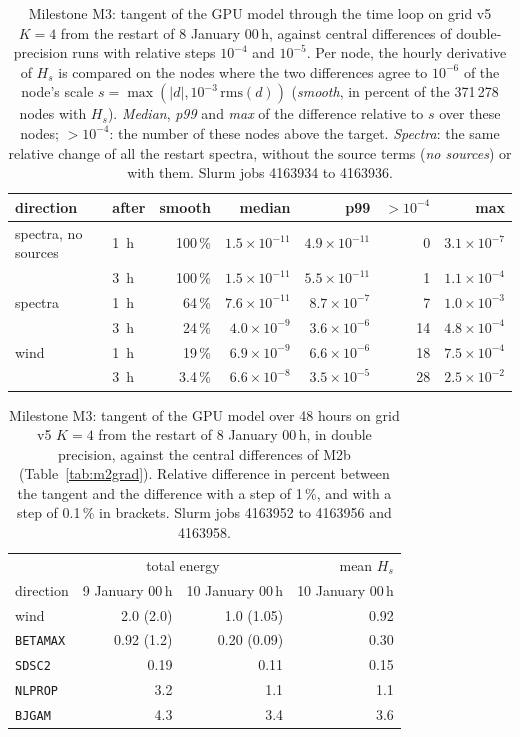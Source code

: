 \documentclass[11pt,a4paper]{article}
\begin{document}
\begin{table}[H]
\centering\small
\begin{tabular}{llrrrrr}
\toprule
direction & after & smooth & median & p99 & $>10^{-4}$ & max \\
\midrule
spectra, no sources & \SI{1}{h} & 100\,\% & $1.5\times10^{-11}$ & $4.9\times10^{-11}$ & 0 & $3.1\times10^{-7}$ \\
 & \SI{3}{h} & 100\,\% & $1.5\times10^{-11}$ & $5.5\times10^{-11}$ & 1 & $1.1\times10^{-4}$ \\
spectra & \SI{1}{h} & 64\,\% & $7.6\times10^{-11}$ & $8.7\times10^{-7}$ & 7 & $1.0\times10^{-3}$ \\
 & \SI{3}{h} & 24\,\% & $4.0\times10^{-9}$ & $3.6\times10^{-6}$ & 14 & $4.8\times10^{-4}$ \\
wind & \SI{1}{h} & 19\,\% & $6.9\times10^{-9}$ & $6.6\times10^{-6}$ & 18 & $7.5\times10^{-4}$ \\
 & \SI{3}{h} & 3.4\,\% & $6.6\times10^{-8}$ & $3.5\times10^{-5}$ & 28 & $2.5\times10^{-2}$ \\
\bottomrule
\end{tabular}
\caption{Milestone M3: tangent of the GPU model through the time loop on
grid v5 $K=4$ from the restart of 8 January 00\,h, against central
differences of double-precision runs with relative steps $10^{-4}$ and
$10^{-5}$. Per node, the hourly derivative of $H_s$ is compared on the
nodes where the two differences agree to $10^{-6}$ of the node's scale
$s=\max(|d|,10^{-3}\,\mathrm{rms}(d))$ (\emph{smooth}, in percent of
the 371\,278 nodes with $H_s$). \emph{Median}, \emph{p99} and \emph{max}
of the difference relative to $s$ over these nodes; $>10^{-4}$: the number
of these nodes above the target. \emph{Spectra}: the same relative change
of all the restart spectra, without the source terms (\emph{no sources})
or with them. Slurm jobs 4163934 to 4163936.}
\label{tab:m3loop}
\end{table}

\begin{table}[H]
\centering\small
\begin{tabular}{lrrr}
\toprule
 & \multicolumn{2}{c}{total energy} & mean $H_s$ \\
direction & 9 January 00\,h & 10 January 00\,h & 10 January 00\,h \\
\midrule
wind & 2.0 (2.0) & 1.0 (1.05) & 0.92 \\
\texttt{BETAMAX} & 0.92 (1.2) & 0.20 (0.09) & 0.30 \\
\texttt{SDSC2} & 0.19 & 0.11 & 0.15 \\
\texttt{NLPROP} & 3.2 & 1.1 & 1.1 \\
\texttt{BJGAM} & 4.3 & 3.4 & 3.6 \\
\bottomrule
\end{tabular}
\caption{Milestone M3: tangent of the GPU model over 48 hours on grid v5
$K=4$ from the restart of 8 January 00\,h, in double precision, against
the central differences of M2b (Table~\ref{tab:m2grad}). Relative
difference in percent between the tangent and the difference with a step
of 1\,\%, and with a step of 0.1\,\% in brackets. Slurm jobs 4163952 to
4163956 and 4163958.}
\label{tab:m3fd}
\end{table}
\end{document}
